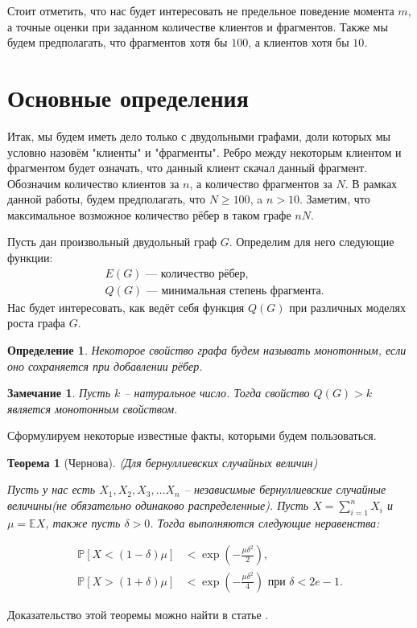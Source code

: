 \documentclass{matmex-diploma-custom}
\newcommand{\Expect}{\mathbb E}
\newcommand{\PRob}{\mathbb P}
\newcommand{\geqs}{\geqslant}
\newtheorem{note}{Замечание}
\newtheorem{define}{Определение}
\theoremstyle{named}
\newtheorem*{namedtheorem}{Теорема}
\begin{document}
Стоит отметить, что нас будет интересовать не предельное поведение момента $m$, а точные оценки при заданном количестве клиентов
и фрагментов. Также мы будем предполагать, что фрагментов хотя бы $100$, а клиентов хотя бы $10$.

\section*{Основные определения}
Итак, мы будем иметь дело только с двудольными графами, доли которых мы условно назовём "клиенты" и "фрагменты".
Ребро между некоторым клиентом и фрагментом будет означать, что данный клиент скачал данный фрагмент.
Обозначим количество клиентов за $n$, а количество фрагментов за $N$. 
В рамках данной работы, будем предполагать, что $N \geqs 100$, a $n > 10$.
Заметим, что максимальное возможное количество рёбер в таком графе $nN$.

Пусть дан произвольный двудольный граф $G$. Определим для него следующие функции:
\begin{align*}
&E(G) \text{ --- количество рёбер,}\\
&Q(G) \text{ --- минимальная степень фрагмента.}
\end{align*}
Нас будет интересовать, как ведёт себя функция $Q(G)$ при различных моделях роста графа $G$.

\begin{define}
Некоторое свойство графа будем называть монотонным, если оно сохраняется при добавлении рёбер.
\end{define}

\begin{note} \label{note1}
Пусть $k$ -- натуральное число. Тогда свойство $Q(G) > k$ является монотонным свойством.
\end{note}

Сформулируем некоторые известные факты, которыми будем пользоваться.

\newpage

\begin{namedtheorem}[Чернова] (Для бернуллиевских случайных величин) \label{Cher} 

Пусть у нас есть $X_1, X_2, X_3, \dots X_n$ -- 
независимые бернуллиевские случайные величины(не обязательно одинаково распределенные). Пусть $X = \sum\limits_{i = 1}^n X_i$ и
$\mu = \Expect X$, также пусть $\delta > 0$. Тогда выполняются следующие неравенства:

\begin{align}\label{ch_1}
\PRob[X < (1-\delta)\mu] &< \exp\left(- \frac{\mu \delta^2}{2} \right),
\\\label{ch_2}
\PRob[X > (1+\delta)\mu] &< \exp\left(- \frac{\mu \delta^2}{4} \right) \text{ при } \delta < 2e - 1.
\end{align}
\end{namedtheorem}
Доказательство этой теоремы можно найти в статье \cite{chernov}.
\end{document}
